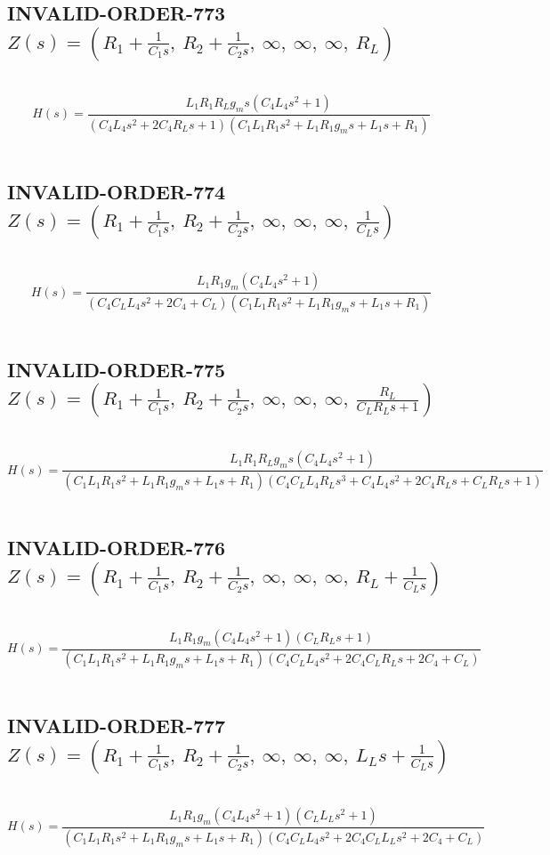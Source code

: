 \documentclass{article}
\begin{document}
\subsection{INVALID-ORDER-773 $Z(s) = \left( R_{1} + \frac{1}{C_{1} s}, \  R_{2} + \frac{1}{C_{2} s}, \  \infty, \  \infty, \  \infty, \  R_{L}\right)$ } \ 
\textbf{\[H(s) = \frac{L_{1} R_{1} R_{L} g_{m} s \left(C_{4} L_{4} s^{2} + 1\right)}{\left(C_{4} L_{4} s^{2} + 2 C_{4} R_{L} s + 1\right) \left(C_{1} L_{1} R_{1} s^{2} + L_{1} R_{1} g_{m} s + L_{1} s + R_{1}\right)}\] } \ 
\subsection{INVALID-ORDER-774 $Z(s) = \left( R_{1} + \frac{1}{C_{1} s}, \  R_{2} + \frac{1}{C_{2} s}, \  \infty, \  \infty, \  \infty, \  \frac{1}{C_{L} s}\right)$ } \ 
\textbf{\[H(s) = \frac{L_{1} R_{1} g_{m} \left(C_{4} L_{4} s^{2} + 1\right)}{\left(C_{4} C_{L} L_{4} s^{2} + 2 C_{4} + C_{L}\right) \left(C_{1} L_{1} R_{1} s^{2} + L_{1} R_{1} g_{m} s + L_{1} s + R_{1}\right)}\] } \ 
\subsection{INVALID-ORDER-775 $Z(s) = \left( R_{1} + \frac{1}{C_{1} s}, \  R_{2} + \frac{1}{C_{2} s}, \  \infty, \  \infty, \  \infty, \  \frac{R_{L}}{C_{L} R_{L} s + 1}\right)$ } \ 
\textbf{\[H(s) = \frac{L_{1} R_{1} R_{L} g_{m} s \left(C_{4} L_{4} s^{2} + 1\right)}{\left(C_{1} L_{1} R_{1} s^{2} + L_{1} R_{1} g_{m} s + L_{1} s + R_{1}\right) \left(C_{4} C_{L} L_{4} R_{L} s^{3} + C_{4} L_{4} s^{2} + 2 C_{4} R_{L} s + C_{L} R_{L} s + 1\right)}\] } \ 
\subsection{INVALID-ORDER-776 $Z(s) = \left( R_{1} + \frac{1}{C_{1} s}, \  R_{2} + \frac{1}{C_{2} s}, \  \infty, \  \infty, \  \infty, \  R_{L} + \frac{1}{C_{L} s}\right)$ } \ 
\textbf{\[H(s) = \frac{L_{1} R_{1} g_{m} \left(C_{4} L_{4} s^{2} + 1\right) \left(C_{L} R_{L} s + 1\right)}{\left(C_{1} L_{1} R_{1} s^{2} + L_{1} R_{1} g_{m} s + L_{1} s + R_{1}\right) \left(C_{4} C_{L} L_{4} s^{2} + 2 C_{4} C_{L} R_{L} s + 2 C_{4} + C_{L}\right)}\] } \ 
\subsection{INVALID-ORDER-777 $Z(s) = \left( R_{1} + \frac{1}{C_{1} s}, \  R_{2} + \frac{1}{C_{2} s}, \  \infty, \  \infty, \  \infty, \  L_{L} s + \frac{1}{C_{L} s}\right)$ } \ 
\textbf{\[H(s) = \frac{L_{1} R_{1} g_{m} \left(C_{4} L_{4} s^{2} + 1\right) \left(C_{L} L_{L} s^{2} + 1\right)}{\left(C_{1} L_{1} R_{1} s^{2} + L_{1} R_{1} g_{m} s + L_{1} s + R_{1}\right) \left(C_{4} C_{L} L_{4} s^{2} + 2 C_{4} C_{L} L_{L} s^{2} + 2 C_{4} + C_{L}\right)}\] } \ 
\end{document}
